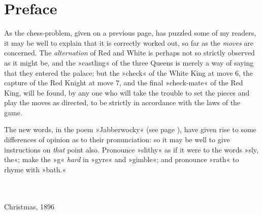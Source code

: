 \chapter*{Preface}

As the chess-problem, given on a previous page, has puzzled some of my readers, it may be well to explain that it is correctly worked out, so far as the \textit{moves} are concerned. The \textit{alternation} of Red and White is perhaps not so strictly observed as it might be, and the »castling« of the three Queens is merely a way of saying that they entered the palace; but the »check« of the White King at move 6, the capture of the Red Knight at move 7, and the final »check-mate« of the Red King, will be found, by any one who will take the trouble to set the pieces and play the moves as directed, to be strictly in accordance with the laws of the game.

The new words, in the poem »Jabberwocky« (see page \pageref{jabberwocky}), have given rise to some differences of opinion as to their pronunciation: so it may be well to give instructions on \textit{that} point also. Pronounce »slithy« as if it were to the words »sly, the«; make the »g« \textit{hard} in »gyre« and »gimble«; and pronounce »rath« to rhyme with »bath.«

~\\
~\\
Christmas, 1896